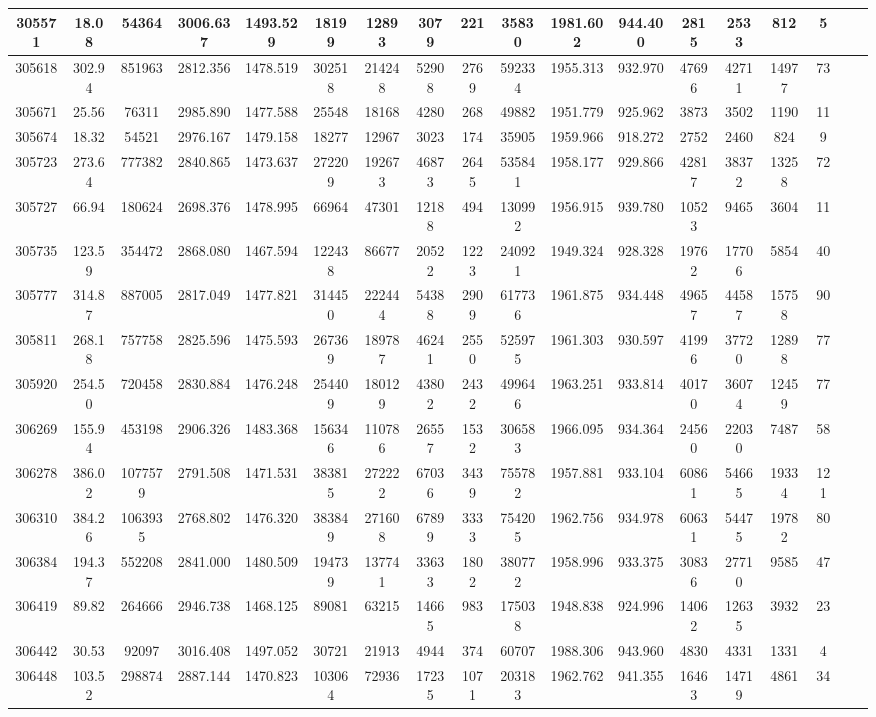 \documentclass[10pt]{extarticle}
\begin{document}
\begin{longtable}{|c|c|c|c|c|c|c|c|c|c|c|c|c|c|c|c|c|c|}
\hline 
305571&18.08&54364&3006.637&1493.529&18199&12893&3079&221&35830&1981.602&944.400&2815&2533&812&5 \\ 
\hline 
305618&302.94&851963&2812.356&1478.519&302518&214248&52908&2769&592334&1955.313&932.970&47696&42711&14977&73 \\ 
\hline 
305671&25.56&76311&2985.890&1477.588&25548&18168&4280&268&49882&1951.779&925.962&3873&3502&1190&11 \\ 
\hline 
305674&18.32&54521&2976.167&1479.158&18277&12967&3023&174&35905&1959.966&918.272&2752&2460&824&9 \\ 
\hline 
305723&273.64&777382&2840.865&1473.637&272209&192673&46873&2645&535841&1958.177&929.866&42817&38372&13258&72 \\ 
\hline 
305727&66.94&180624&2698.376&1478.995&66964&47301&12188&494&130992&1956.915&939.780&10523&9465&3604&11 \\ 
\hline 
305735&123.59&354472&2868.080&1467.594&122438&86677&20522&1223&240921&1949.324&928.328&19762&17706&5854&40 \\ 
\hline 
305777&314.87&887005&2817.049&1477.821&314450&222444&54388&2909&617736&1961.875&934.448&49657&44587&15758&90 \\ 
\hline 
305811&268.18&757758&2825.596&1475.593&267369&189787&46241&2550&525975&1961.303&930.597&41996&37720&12898&77 \\ 
\hline 
305920&254.50&720458&2830.884&1476.248&254409&180129&43802&2432&499646&1963.251&933.814&40170&36074&12459&77 \\ 
\hline 
306269&155.94&453198&2906.326&1483.368&156346&110786&26557&1532&306583&1966.095&934.364&24560&22030&7487&58 \\ 
\hline 
306278&386.02&1077579&2791.508&1471.531&383815&272222&67036&3439&755782&1957.881&933.104&60861&54665&19334&121 \\ 
\hline 
306310&384.26&1063935&2768.802&1476.320&383849&271608&67899&3333&754205&1962.756&934.978&60631&54475&19782&80 \\ 
\hline 
306384&194.37&552208&2841.000&1480.509&194739&137741&33633&1802&380772&1958.996&933.375&30836&27710&9585&47 \\ 
\hline 
306419&89.82&264666&2946.738&1468.125&89081&63215&14665&983&175038&1948.838&924.996&14062&12635&3932&23 \\ 
\hline 
306442&30.53&92097&3016.408&1497.052&30721&21913&4944&374&60707&1988.306&943.960&4830&4331&1331&4 \\ 
\hline 
306448&103.52&298874&2887.144&1470.823&103064&72936&17235&1071&203183&1962.762&941.355&16463&14719&4861&34 \\ 

\end{longtable}
\end{document}
